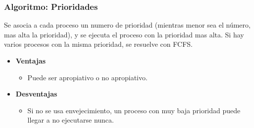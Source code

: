 \documentclass{beamer}
\newcommand{\algTitle}{\textbf{Algoritmo}: }
\begin{document}
\begin{frame}
\frametitle{\algTitle Prioridades}

Se asocia a cada proceso un numero de prioridad (mientras menor sea el número, mas alta la prioridad), y
se ejecuta el proceso con la prioridad mas alta. Si hay varios procesos con la misma prioridad, se resuelve con FCFS.

\begin{itemize}
	\item \textbf{Ventajas}
	\begin{itemize}
		\item Puede ser apropiativo o no apropiativo.
	\end{itemize}
	\vspace{0.5cm}
	
	\item \textbf{Desventajas}
	\begin{itemize}
		\item Si no se usa envejecimiento, un proceso con muy baja prioridad puede llegar
		a no ejecutarse nunca.
	\end{itemize}
\end{itemize}
\end{frame}
\end{document}

